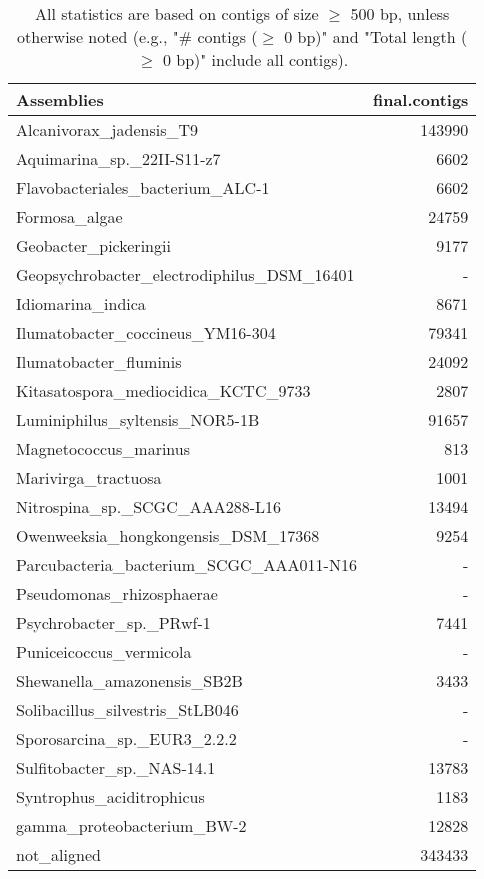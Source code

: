 \documentclass[12pt,a4paper]{article}
\begin{document}
\begin{table}[ht]
\begin{center}
\caption{All statistics are based on contigs of size $\geq$ 500 bp, unless otherwise noted (e.g., "\# contigs ($\geq$ 0 bp)" and "Total length ($\geq$ 0 bp)" include all contigs).}
\begin{tabular}{|l*{1}{|r}|}
\hline
Assemblies & final.contigs \\ \hline
Alcanivorax\_jadensis\_T9 & 143990 \\ \hline
Aquimarina\_sp.\_22II-S11-z7 & 6602 \\ \hline
Flavobacteriales\_bacterium\_ALC-1 & 6602 \\ \hline
Formosa\_algae & 24759 \\ \hline
Geobacter\_pickeringii & 9177 \\ \hline
Geopsychrobacter\_electrodiphilus\_DSM\_16401 & - \\ \hline
Idiomarina\_indica & 8671 \\ \hline
Ilumatobacter\_coccineus\_YM16-304 & 79341 \\ \hline
Ilumatobacter\_fluminis & 24092 \\ \hline
Kitasatospora\_mediocidica\_KCTC\_9733 & 2807 \\ \hline
Luminiphilus\_syltensis\_NOR5-1B & 91657 \\ \hline
Magnetococcus\_marinus & 813 \\ \hline
Marivirga\_tractuosa & 1001 \\ \hline
Nitrospina\_sp.\_SCGC\_AAA288-L16 & 13494 \\ \hline
Owenweeksia\_hongkongensis\_DSM\_17368 & 9254 \\ \hline
Parcubacteria\_bacterium\_SCGC\_AAA011-N16 & - \\ \hline
Pseudomonas\_rhizosphaerae & - \\ \hline
Psychrobacter\_sp.\_PRwf-1 & 7441 \\ \hline
Puniceicoccus\_vermicola & - \\ \hline
Shewanella\_amazonensis\_SB2B & 3433 \\ \hline
Solibacillus\_silvestris\_StLB046 & - \\ \hline
Sporosarcina\_sp.\_EUR3\_2.2.2 & - \\ \hline
Sulfitobacter\_sp.\_NAS-14.1 & 13783 \\ \hline
Syntrophus\_aciditrophicus & 1183 \\ \hline
gamma\_proteobacterium\_BW-2 & 12828 \\ \hline
not\_aligned & 343433 \\ \hline
\end{tabular}
\end{center}
\end{table}
\end{document}
